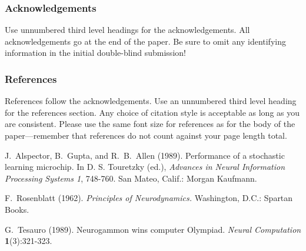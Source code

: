 \documentclass[twoside]{article} \usepackage{aistats2017}
\begin{document}
\subsubsection*{Acknowledgements}

Use unnumbered third level headings for the acknowledgements.  All
acknowledgements go at the end of the paper.  Be sure to omit any
identifying information in the initial double-blind submission!


\subsubsection*{References}

References follow the acknowledgements.  Use an unnumbered third level
heading for the references section.  Any choice of citation style is
acceptable as long as you are consistent.  Please use the same font
size for references as for the body of the paper---remember that
references do not count against your page length total.

J.~Alspector, B.~Gupta, and R.~B.~Allen (1989). Performance of a
stochastic learning microchip.  In D. S. Touretzky (ed.), {\it
  Advances in Neural Information Processing Systems 1}, 748-760.  San
Mateo, Calif.: Morgan Kaufmann.

F.~Rosenblatt (1962). {\it Principles of Neurodynamics.} Washington,
D.C.: Spartan Books.

G.~Tesauro (1989). Neurogammon wins computer Olympiad.  {\it Neural
  Computation} {\bf 1}(3):321-323.
\end{document}

